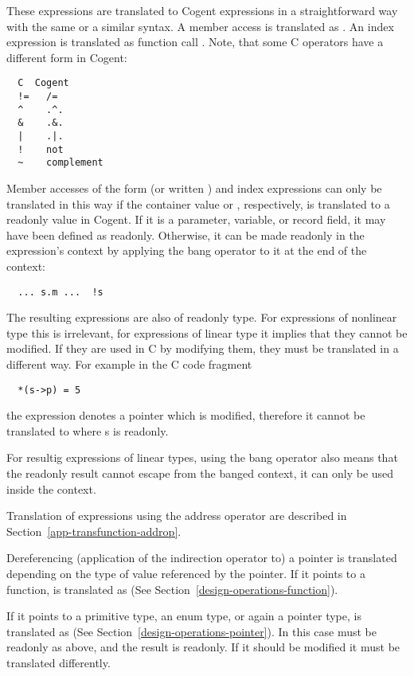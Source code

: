 These expressions are translated to Cogent expressions in a straightforward way with the same or a similar syntax.
A member access  is translated as . An index expression  is translated as function 
call . Note, that some C operators have a different form in Cogent:
\begin{verbatim}
  C  Cogent
  !=   /=
  ^    .^.
  &    .&.
  |    .|.
  !    not
  ~    complement
\end{verbatim}

Member accesses of the form  (or written ) and index expressions  can only be 
translated in this way if the
container value  or , respectively, is translated to a readonly value in Cogent. If it is a parameter,
variable, or record field, it may have been defined as readonly. Otherwise, it can be made readonly in the expression's
context by applying the bang operator \code{!} to it at the end of the context:
\begin{verbatim}
  ... s.m ...  !s
\end{verbatim}
The resulting expressions are also of readonly type. For expressions of nonlinear type this is irrelevant, for expressions
of linear type it implies that they cannot be modified. If they are used in C by modifying them, they must be translated
in a different way. For example in the C code fragment
\begin{verbatim}
  *(s->p) = 5
\end{verbatim}
the expression  denotes a pointer which is modified, therefore it cannot be translated to  where 
s is readonly.

For resultig expressions of linear types, using the bang operator \code{!} also means that the readonly result cannot
escape from the banged context, it can only be used inside the context.

Translation of expressions using the address operator \code{\&} are described in Section~\ref{app-transfunction-addrop}.

Dereferencing (application of the indirection operator \code{*} to) a pointer is translated depending on the type of value referenced by 
the pointer. If it points to a function,  is translated as  
(See Section~\ref{design-operations-function}). 

If it points to a primitive type, an enum type, or again a pointer type, 
 is translated as  (See Section~\ref{design-operations-pointer}). In this case  
must be readonly as above, and the result is readonly. If it should be modified it must be translated differently.

